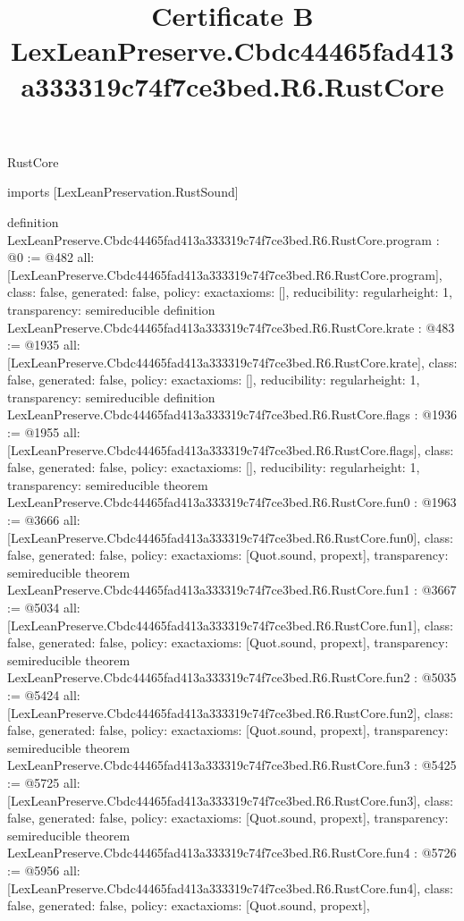 \begin{lexlean}{RustCore}
\title{Certificate B LexLeanPreserve.Cbdc44465fad413a333319c74f7ce3bed.R6.RustCore}
\begin{coremodule}
imports [LexLeanPreservation.RustSound]

definition LexLeanPreserve.Cbdc44465fad413a333319c74f7ce3bed.R6.RustCore.program : @0 := @482 {
  all: [LexLeanPreserve.Cbdc44465fad413a333319c74f7ce3bed.R6.RustCore.program],
  class: false,
  generated: false,
  policy: exact{axioms: []},
  reducibility: regular{height: 1},
  transparency: semireducible
}
definition LexLeanPreserve.Cbdc44465fad413a333319c74f7ce3bed.R6.RustCore.krate : @483 := @1935 {
  all: [LexLeanPreserve.Cbdc44465fad413a333319c74f7ce3bed.R6.RustCore.krate],
  class: false,
  generated: false,
  policy: exact{axioms: []},
  reducibility: regular{height: 1},
  transparency: semireducible
}
definition LexLeanPreserve.Cbdc44465fad413a333319c74f7ce3bed.R6.RustCore.flags : @1936 := @1955 {
  all: [LexLeanPreserve.Cbdc44465fad413a333319c74f7ce3bed.R6.RustCore.flags],
  class: false,
  generated: false,
  policy: exact{axioms: []},
  reducibility: regular{height: 1},
  transparency: semireducible
}
theorem LexLeanPreserve.Cbdc44465fad413a333319c74f7ce3bed.R6.RustCore.fun0 : @1963 := @3666 {
  all: [LexLeanPreserve.Cbdc44465fad413a333319c74f7ce3bed.R6.RustCore.fun0],
  class: false,
  generated: false,
  policy: exact{axioms: [Quot.sound, propext]},
  transparency: semireducible
}
theorem LexLeanPreserve.Cbdc44465fad413a333319c74f7ce3bed.R6.RustCore.fun1 : @3667 := @5034 {
  all: [LexLeanPreserve.Cbdc44465fad413a333319c74f7ce3bed.R6.RustCore.fun1],
  class: false,
  generated: false,
  policy: exact{axioms: [Quot.sound, propext]},
  transparency: semireducible
}
theorem LexLeanPreserve.Cbdc44465fad413a333319c74f7ce3bed.R6.RustCore.fun2 : @5035 := @5424 {
  all: [LexLeanPreserve.Cbdc44465fad413a333319c74f7ce3bed.R6.RustCore.fun2],
  class: false,
  generated: false,
  policy: exact{axioms: [Quot.sound, propext]},
  transparency: semireducible
}
theorem LexLeanPreserve.Cbdc44465fad413a333319c74f7ce3bed.R6.RustCore.fun3 : @5425 := @5725 {
  all: [LexLeanPreserve.Cbdc44465fad413a333319c74f7ce3bed.R6.RustCore.fun3],
  class: false,
  generated: false,
  policy: exact{axioms: [Quot.sound, propext]},
  transparency: semireducible
}
theorem LexLeanPreserve.Cbdc44465fad413a333319c74f7ce3bed.R6.RustCore.fun4 : @5726 := @5956 {
  all: [LexLeanPreserve.Cbdc44465fad413a333319c74f7ce3bed.R6.RustCore.fun4],
  class: false,
  generated: false,
  policy: exact{axioms: [Quot.sound, propext]},
}
\end{coremodule}
\end{lexlean}
